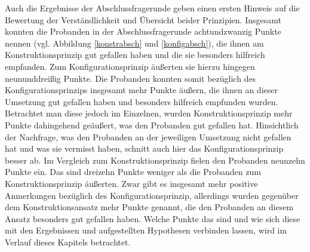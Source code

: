 Auch die Ergebnisse der Abschlussfragerunde geben einen ersten Hinweis auf die Bewertung der Verständlichkeit und Übersicht beider Prinzipien. Insgesamt konnten die Probanden in der Abschlussfragerunde achtundzwanzig Punkte nennen (vgl. Abbildung \ref{konstrabsch} und \ref{konfigabsch}), die ihnen am Konstruktionsprinzip gut gefallen haben und die sie besonders hilfreich empfanden. Zum Konfigurationsprinzip äußerten sie hierzu hingegen neununddreißig Punkte. Die Probanden konnten somit bezüglich des Konfigurationsprinzips insgesamt mehr Punkte äußern, die ihnen an dieser Umsetzung gut gefallen haben und besonders hilfreich empfunden wurden. Betrachtet man diese jedoch im Einzelnen, wurden Konstruktionsprinzip mehr Punkte dahingehend geäußert, was den Probanden gut gefallen hat. Hinsichtlich der Nachfrage, was den Probanden an der jeweiligen Umsetzung nicht gefallen hat und was sie vermisst haben, schnitt auch hier das Konfigurationsprinzip besser ab. Im Vergleich zum Konstruktionsprinzip fielen den Probanden neunzehn Punkte ein. Das sind dreizehn Punkte weniger als die Probanden zum Konstruktionsprinzip äußerten. Zwar gibt es insgesamt mehr positive Anmerkungen bezüglich des Konfigurationsprinzip, allerdings wurden gegenüber dem Konstruktionsansatz mehr Punkte genannt, die den Probanden an diesem Ansatz besonders gut gefallen haben. Welche Punkte das sind und wie sich diese mit den Ergebnissen und aufgestellten Hypothesen verbinden lassen, wird im Verlauf dieses Kapitels betrachtet.


